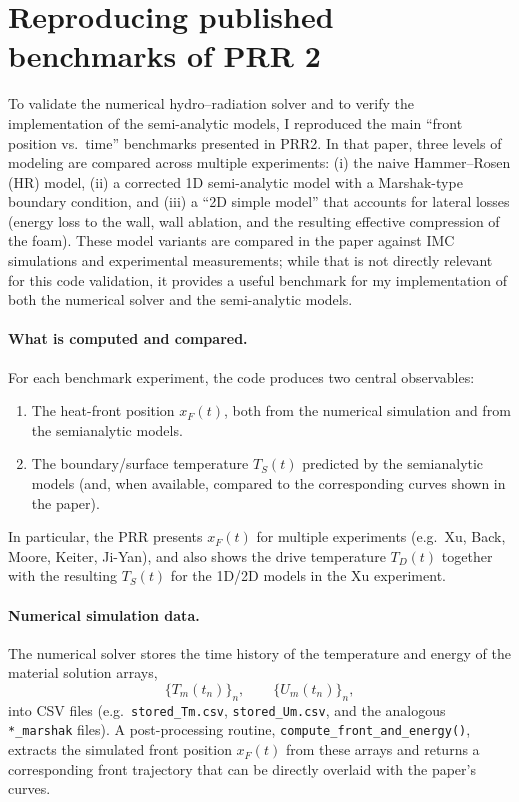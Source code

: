 \documentclass{article}
\begin{document}
\section{Reproducing published benchmarks of PRR 2}
\label{subsec:validation_article2}

To validate the numerical hydro--radiation solver and to verify the implementation of the semi-analytic models, I reproduced the main ``front position vs.\ time'' benchmarks presented in PRR2. In that paper, three levels of modeling are compared across multiple experiments: (i) the naive Hammer--Rosen (HR) model, (ii) a corrected 1D semi-analytic model with a Marshak-type boundary condition, and (iii) a ``2D simple model'' that accounts for lateral losses (energy loss to the wall, wall ablation, and the resulting effective compression of the foam). These model variants are compared in the paper against IMC simulations and experimental measurements; while that is not directly relevant for this code validation, it provides a useful benchmark for my implementation of both the numerical solver and the semi-analytic models.

\paragraph{What is computed and compared.}
For each benchmark experiment, the code produces two central observables:
\begin{enumerate}
    \item The heat-front position $x_F(t)$, both from the numerical simulation and from the semianalytic models.
    \item The boundary/surface temperature $T_S(t)$ predicted by the semianalytic models (and, when available, compared to the corresponding curves shown in the paper).
\end{enumerate}
In particular, the PRR presents $x_F(t)$ for multiple experiments (e.g.\ Xu, Back, Moore, Keiter, Ji-Yan), and also shows the drive temperature $T_D(t)$ together with the resulting $T_S(t)$ for the 1D/2D models in the Xu experiment.

\paragraph{Numerical simulation data.}
The numerical solver stores the time history of the temperature and energy of the material solution arrays,
\[
\{T_m(t_n)\}_{n},\qquad \{U_m(t_n)\}_{n},
\]
into CSV files (e.g.\ \texttt{stored\_Tm.csv}, \texttt{stored\_Um.csv}, and the analogous \texttt{*\_marshak} files). A post-processing routine,
\texttt{compute\_front\_and\_energy()},
extracts the simulated front position $x_F(t)$ from these arrays and returns a corresponding front trajectory that can be directly overlaid with the paper's curves.
\end{document}
